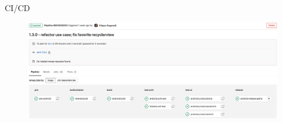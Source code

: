     \begin{frame}{CI/CD}
        \begin{figure}[H]
        \centering
        \includegraphics[width=1\textwidth]{img/Screenshot 2022-10-10 at 09.16.13.png}
        \end{figure}
    \end{frame}

